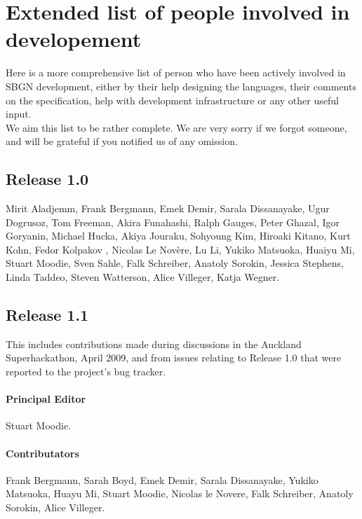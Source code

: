 \chapter{Extended list of people involved in \SBGNPDLone developement}\label{sec:acknowledgments}

Here is a more comprehensive list of person who have been actively involved in SBGN development, either by their help designing the languages, their comments on the specification, help with development infrastructure or any other useful input.\\[\baselineskip]

 We aim this list to be rather complete. We are very sorry if we forgot someone, and will be grateful if you notified us of any omission.

\section{Release 1.0}

Mirit Aladjemm, Frank Bergmann, Emek Demir, Sarala Dissanayake, Ugur Dogrusoz, Tom Freeman, Akira Funahashi, Ralph Gauges, Peter Ghazal, Igor Goryanin, Michael Hucka, Akiya Jouraku, Sohyoung Kim, Hiroaki Kitano, Kurt Kohn, Fedor Kolpakov , Nicolas Le Nov\`{e}re, Lu Li, Yukiko Matsuoka, Huaiyu Mi, Stuart Moodie, Sven Sahle, Falk Schreiber, Anatoly Sorokin, Jessica Stephens, Linda Taddeo, Steven Watterson, Alice Villeger, Katja Wegner.\\[\baselineskip]

\section{Release 1.1}

This includes contributions made during discussions in the Auckland Superhackathon, April 2009, and from issues relating to Release 1.0 that were reported to the project's bug tracker.

\subsubsection*{Principal Editor}

Stuart Moodie.

\subsubsection*{Contributators}

Frank Bergmann, Sarah Boyd, Emek Demir, Sarala Dissanayake, Yukiko Matsuoka, Huayu Mi, Stuart Moodie, Nicolas le Novere, Falk Schreiber, Anatoly Sorokin, Alice Villeger.

